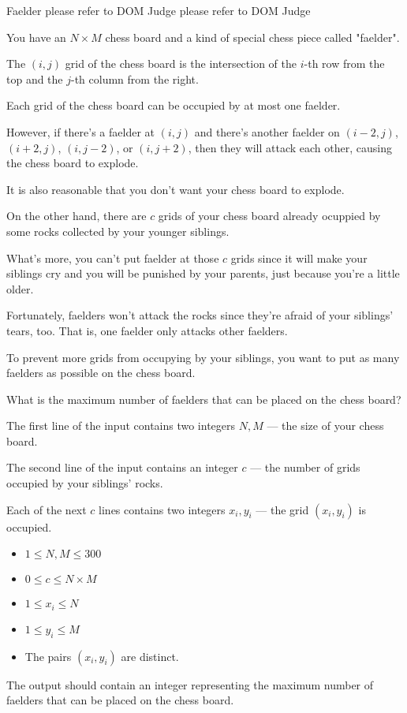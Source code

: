 \gdef\thisproblemauthor{}
\gdef\thisproblemdeveloper{}
\gdef\thisproblemorigin{}
\begin{problem}{Faelder}
{}{}
{please refer to DOM Judge}
{please refer to DOM Judge}
{}

You have an $N\times M$ chess board and a kind of special chess piece called "faelder".

The $(i, j)$ grid of the chess board is the intersection of the $i$-th row from the top and the $j$-th column from the right.

Each grid of the chess board can be occupied by at most one faelder.

However, if there's a faelder at $(i, j)$ and there's another faelder on $(i-2, j)$, $(i+2, j)$, $(i, j-2)$, or $(i,j+2)$, then they will attack each other, causing the chess board to explode.

It is also reasonable that you don't want your chess board to explode.

On the other hand, there are $c$ grids of your chess board already ocuppied by some rocks collected by your younger siblings.

What's more, you can't put faelder at those $c$ grids since it will make your siblings cry and you will be punished by your parents, just because you're a little older.

Fortunately, faelders won't attack the rocks since they're afraid of your siblings' tears, too. That is, one faelder only attacks other faelders.

To prevent more grids from occupying by your siblings, you want to put as many faelders as possible on the chess board.

What is the maximum number of faelders that can be placed on the chess board?

\InputFile
The first line of the input contains two integers $N, M$ --- the size of your chess board.

The second line of the input contains an integer $c$ --- the number of grids occupied by your siblings' rocks.

Each of the next $c$ lines contains two integers $x_i, y_i$ --- the grid $(x_i, y_i)$ is occupied.

\begin{itemize}
    \item $1 \leq N, M \leq 300$
    \item $0 \leq c \leq N\times M$
    \item $1 \leq x_i \leq N$
    \item $1 \leq y_i \leq M$
    \item The pairs $(x_i, y_i)$ are distinct.
\end{itemize}

\OutputFile
The output should contain an integer representing the maximum number of faelders that can be placed on the chess board.

\Examples

\begin{example}
%
%
\end{example}

\end{problem}
